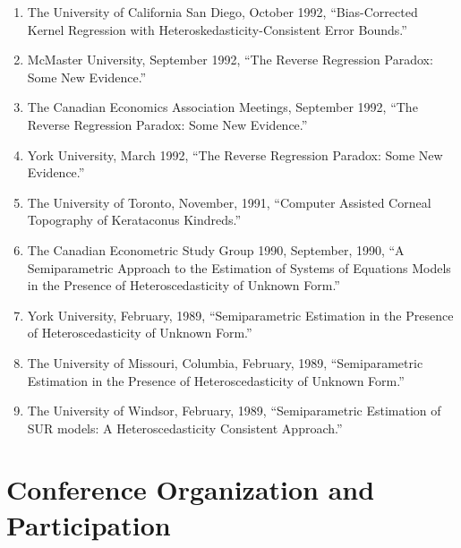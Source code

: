 \documentclass[
]{article}
\begin{document}
\begin{enumerate}
  South East Asia Meetings of the Econometric Society, Bombay India,
  December, 1992, ``Bias-Corrected Kernel Regression with
  Heteroskedasticity-Consistent Error Bounds.''
\item
  The University of California San Diego, October 1992, ``Bias-Corrected
  Kernel Regression with Heteroskedasticity-Consistent Error Bounds.''
\item
  McMaster University, September 1992, ``The Reverse Regression Paradox:
  Some New Evidence.''
\item
  The Canadian Economics Association Meetings, September 1992, ``The
  Reverse Regression Paradox: Some New Evidence.''
\item
  York University, March 1992, ``The Reverse Regression Paradox: Some
  New Evidence.''
\item
  The University of Toronto, November, 1991, ``Computer Assisted Corneal
  Topography of Kerataconus Kindreds.''
\item
  The Canadian Econometric Study Group 1990, September, 1990, ``A
  Semiparametric Approach to the Estimation of Systems of Equations
  Models in the Presence of Heteroscedasticity of Unknown Form.''
\item
  York University, February, 1989, ``Semiparametric Estimation in the
  Presence of Heteroscedasticity of Unknown Form.''
\item
  The University of Missouri, Columbia, February, 1989, ``Semiparametric
  Estimation in the Presence of Heteroscedasticity of Unknown Form.''
\item
  The University of Windsor, February, 1989, ``Semiparametric Estimation
  of SUR models: A Heteroscedasticity Consistent Approach.''
\end{enumerate}

\section*{Conference Organization and
Participation}\label{conference-organization-and-participation}
\end{document}

